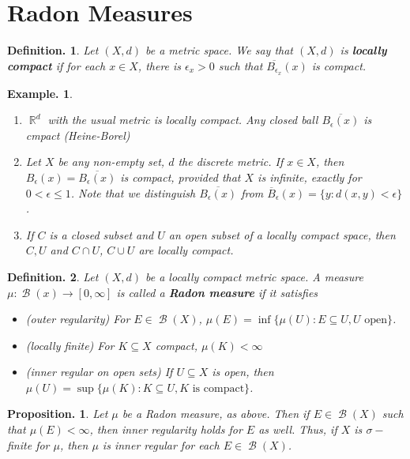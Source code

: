 \documentclass[11pt, a4paper]{memoir}
\DeclareMathOperator{\R}{{\mathbb{R}}}
\newcommand{\ol}[1]{\ensuremath{\overline{#1}}}
\theoremstyle{change}
\newtheorem{proposition}[theorem]{Proposition.}
\theoremstyle{plain}
\theoremstyle{nonumberplain}
\newtheorem{definition}{Definition.}
\newtheorem{example}{Example.}
\DeclareMathOperator{\B}{{\mathcal{B}}}
\numberwithin{equation}{section}
\begin{document}
\section{Radon Measures}
\begin{definition}
    Let $(X,d)$ be a metric space.
    We say that $(X,d)$ is \textbf{locally compact} if for each $x\in X$, there is $\epsilon_x>0$ such that $\ol{B_{\epsilon_x}}(x)$ is compact.
\end{definition}
\begin{example}
    \begin{enumerate}[label=(\roman*)]
        \item $\R^d$ with the usual metric is locally compact.
            Any closed ball $\ol{B_\epsilon(x)}$ is cmpact (Heine-Borel)
        \item Let $X$ be any non-empty set, $d$ the discrete metric.
            If $x\in X$, then $B_\epsilon(x)=\ol{B_\epsilon(x)}$ is compact, provided that $X$ is infinite, exactly for $0<\epsilon\leq 1$.
            Note that we distinguish $\ol{B_{\epsilon}(x)}$ from $\ol{B}_\epsilon(x)=\{y:d(x,y)<\epsilon\}$.
        \item If $C$ is a closed subset and $U$ an open subset of a locally compact space, then $C,U$ and $C\cap U$, $C\cup U$ are locally compact.
    \end{enumerate}
\end{example}
\begin{definition}
    Let $(X,d)$ be a locally compact metric space.
    A measure $\mu:\B(x)\to[0,\infty]$ is called a \textbf{Radon measure} if it satisfies
    \begin{itemize}[nolistsep]
        \item \textit{(outer regularity)} For $E\in\B(X)$, $\mu(E)=\inf\{\mu(U):E\subseteq U, U\text{ open}\}$.
        \item \textit{(locally finite)} For $K\subseteq X$ compact, $\mu(K)<\infty$
        \item \textit{(inner regular on open sets)} If $U\subseteq X$ is open, then $\mu(U)=\sup\{\mu(K):K\subseteq U, K\text{ is compact}\}$.
    \end{itemize}
\end{definition}
\begin{proposition}
    Let $\mu$ be a Radon measure, as above.
    Then if $E\in\B(X)$ such that $\mu(E)<\infty$, then inner regularity holds for $E$ as well.
    Thus, if $X$ is $\sigma-$finite for $\mu$, then $\mu$ is inner regular for each $E\in\B(X)$.
\end{proposition}
\end{document}
